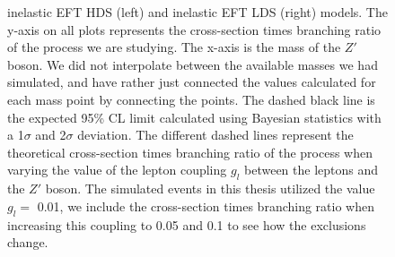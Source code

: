 \documentclass[12pt, a4paper]{book}
\begin{document}
\begin{figure}[!ht]
{   inelastic EFT HDS (left) and inelastic EFT LDS (right) models.
   The y-axis on all plots represents the cross-section times branching ratio of the process we are studying. The x-axis is the mass of the $Z'$ boson. We did not interpolate between the available masses we had simulated, 
   and have rather just connected the values calculated for each mass point by connecting the points. The dashed black line is the expected 95\% CL limit calculated using Bayesian statistics with a 1$\sigma$ and 2$\sigma$ deviation. 
   The different dashed lines represent the theoretical cross-section times branching ratio of the process when varying the value of the lepton coupling $g_l$ between the leptons and the $Z'$ boson. The simulated events in this thesis utilized the value $g_l=$ 0.01, we include the cross-section times branching ratio when increasing this coupling to 0.05 and 0.1 to see how the exclusions change. 
   }\label{fig:model_dep_mono_Zp_excl}
\end{figure}



\clearpage
\end{document}
